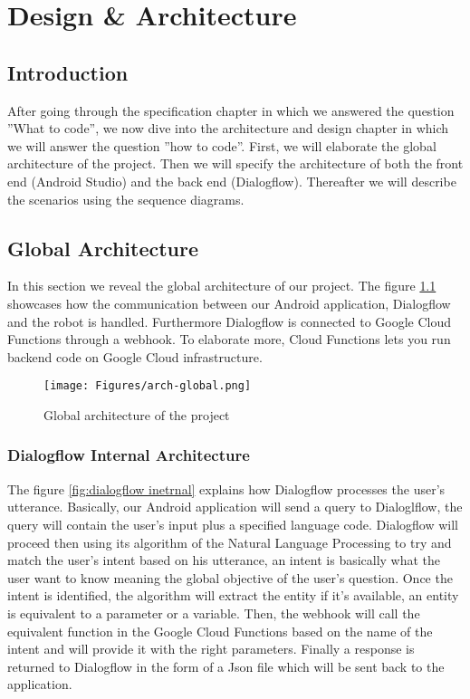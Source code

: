 
\chapter{Design \& Architecture} %

\label{Chapter4} %

\section{Introduction}
After going through the specification chapter in which we answered the question ''What to code'', we now dive into the architecture and design chapter in which we will answer the question ''how to code''. First, we will elaborate the global architecture of the project. Then we will specify the architecture of both the front end (Android Studio) and the back end (Dialogflow). Thereafter we will describe the scenarios using the sequence diagrams.

\section{Global Architecture}
In this section we reveal the global architecture of our project. The figure \ref{fig:global arch} showcases how the communication between our Android application, Dialogflow and the robot is handled. Furthermore Dialogflow is connected to Google Cloud Functions through a webhook. To elaborate more, Cloud Functions lets you run backend code on Google Cloud infrastructure.
\begin{figure}[H]
\centering
\texttt{[image: Figures/arch-global.png]}
\caption{Global architecture of the project}
\label{fig:global arch}
\end{figure}
\subsection{Dialogflow Internal Architecture}
The figure \ref{fig:dialogflow inetrnal} explains how Dialogflow processes the user's utterance. Basically, our Android application will send a query to Dialoglflow, the query will contain the user's input plus a specified language code. Dialogflow will proceed then using its algorithm of the Natural Language Processing to try and match the user's intent based on his utterance, an intent is basically what the user want to know meaning the global objective of the user's question. Once the intent is identified, the algorithm will extract  the entity if it's available, an entity is equivalent to a parameter or a variable. Then, the webhook will call the equivalent function in the Google Cloud Functions based on the name of the intent and will provide it with the right parameters. Finally a response is returned to Dialogflow in the form of a Json file which will be sent back to the application.   

